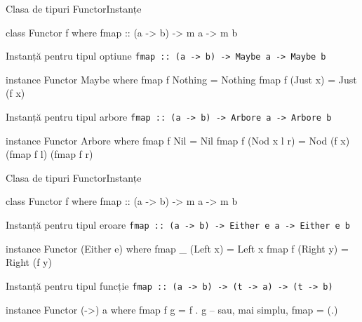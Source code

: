 \documentclass[xcolor=pdftex,romanian,colorlinks]{beamer}
\begin{document}
\begin{frame}[fragile]{Clasa de tipuri Functor}{Instanțe}
\begin{asciihs}
class Functor f where
  fmap :: (a -> b) -> m a -> m b
\end{asciihs}
\vfill
\begin{block}{Instanță pentru tipul optiune \lstinline$fmap :: (a -> b) -> Maybe a -> Maybe b$}
\begin{asciihs}
instance Functor Maybe where
  fmap f Nothing = Nothing
  fmap f (Just x) = Just (f x)
\end{asciihs}
\end{block}
\vfill
{}
\begin{block}{Instanță pentru tipul arbore \lstinline$fmap :: (a -> b) -> Arbore a -> Arbore b$}
\begin{asciihs}
instance Functor Arbore where
  fmap f Nil = Nil
  fmap f (Nod x l r) = Nod (f x) (fmap f l) (fmap f r)
\end{asciihs}
\end{block}
\end{frame}

\begin{frame}[fragile]{Clasa de tipuri Functor}{Instanțe}
\begin{asciihs}
class Functor f where
  fmap :: (a -> b) -> m a -> m b
\end{asciihs}
\vfill
\begin{block}{Instanță pentru tipul eroare \lstinline$fmap :: (a -> b) -> Either e a -> Either e b$}
\begin{asciihs}
instance Functor (Either e) where
    fmap _ (Left x) = Left x
    fmap f (Right y) = Right (f y)
\end{asciihs}
\end{block}
\vfill
{}
\begin{block}{Instanță pentru tipul funcție \lstinline$fmap :: (a -> b) -> (t -> a) -> (t -> b)$}
\begin{asciihs}
instance Functor (->) a where
  fmap f g = f . g  -- sau, mai simplu, fmap = (.)
\end{asciihs}
\end{block}
\end{frame}
\end{document}
